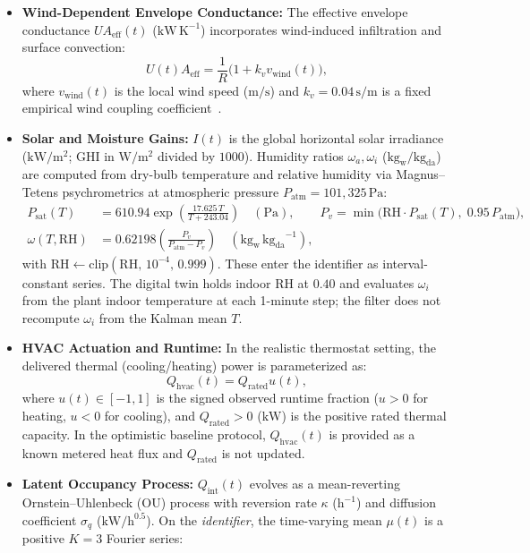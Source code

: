 \documentclass[11pt,letterpaper]{article}
\begin{document}
\begin{itemize}
\item \textbf{Wind-Dependent Envelope Conductance:} The effective envelope conductance $UA_\mathrm{eff}(t)$ ($\mathrm{kW\,K}^{-1}$) incorporates wind-induced infiltration and surface convection:
\begin{equation}
\label{eq:ua-eff}
U(t)A_\mathrm{eff} = \frac{1}{R}\bigl(1 + k_v v_\mathrm{wind}(t)\bigr),
\end{equation}
where $v_\mathrm{wind}(t)$ is the local wind speed ($\mathrm{m/s}$) and $k_v = 0.04\,\mathrm{s/m}$ is a fixed empirical wind coupling coefficient~\cite{bacher2011}.
\item \textbf{Solar and Moisture Gains:} $I(t)$ is the global horizontal solar irradiance ($\mathrm{kW/m^2}$; GHI in $\mathrm{W/m^2}$ divided by $1000$). Humidity ratios $\omega_a, \omega_i$ ($\mathrm{kg_w/kg_{da}}$) are computed from dry-bulb temperature and relative humidity via Magnus--Tetens psychrometrics at atmospheric pressure $P_\mathrm{atm}=101{,}325\,\mathrm{Pa}$:
\begin{align}
\label{eq:psych}
P_\mathrm{sat}(T) &= 610.94 \exp\left( \frac{17.625\,T}{T + 243.04} \right) \quad (\mathrm{Pa}), \qquad P_v = \min\bigl(\mathrm{RH}\cdot P_\mathrm{sat}(T),\; 0.95\,P_\mathrm{atm}\bigr), \\
\omega(T, \mathrm{RH}) &= 0.62198 \left( \frac{P_v}{P_\mathrm{atm} - P_v} \right) \quad (\mathrm{kg_w\,kg_{da}}^{-1}),
\end{align}
with $\mathrm{RH} \leftarrow \mathrm{clip}(\mathrm{RH},\,10^{-4},\,0.999)$. These enter the identifier as interval-constant series. The digital twin holds indoor RH at $0.40$ and evaluates $\omega_i$ from the plant indoor temperature at each 1-minute step; the filter does not recompute $\omega_i$ from the Kalman mean $T$.
\item \textbf{HVAC Actuation and Runtime:} In the realistic thermostat setting, the delivered thermal (cooling/heating) power is parameterized as:
\begin{equation}
\label{eq:qhvac}
Q_\mathrm{hvac}(t) = Q_\mathrm{rated} u(t),
\end{equation}
where $u(t) \in [-1, 1]$ is the signed observed runtime fraction ($u > 0$ for heating, $u < 0$ for cooling), and $Q_\mathrm{rated} > 0$ ($\mathrm{kW}$) is the positive rated thermal capacity. In the optimistic baseline protocol, $Q_\mathrm{hvac}(t)$ is provided as a known metered heat flux and $Q_\mathrm{rated}$ is not updated.
\item \textbf{Latent Occupancy Process:} $Q_\mathrm{int}(t)$ evolves as a mean-reverting Ornstein--Uhlenbeck (OU) process with reversion rate $\kappa$ ($\mathrm{h}^{-1}$) and diffusion coefficient $\sigma_q$ ($\mathrm{kW/h^{0.5}}$). On the \emph{identifier}, the time-varying mean $\mu(t)$ is a positive $K=3$ Fourier series:

\end{itemize}
\end{document}
